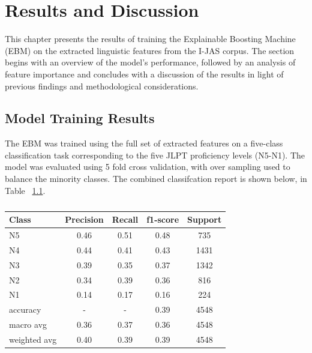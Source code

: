 \chapter{Results and Discussion}
This chapter presents the results of training the Explainable Boosting Machine (EBM) on the extracted linguistic
features from the I-JAS corpus. The section begins with an overview of the model's performance, followed by an
analysis of feature importance and concludes with a discussion of the results in light of previous findings and
methodological considerations.


\section{Model Training Results}

The EBM was trained using the full set of extracted features on a five-class classification task corresponding to
the five JLPT proficiency levels (N5-N1). The model was evaluated using 5 fold cross validation, with over sampling
used to balance the minority classes. The combined classifcation report is shown below, in Table~
\ref{tab:trainingResults}.


\begin{table}[h!]
    \centering
    \begin{tabular}{lcccc}
        \hline \textbf{Class} & \textbf{Precision} & \textbf{Recall} & \textbf{f1-score} & \textbf{Support} \\ \hline
        N5    &   0.46   &   0.51   &   0.48   &    735\\
          N4    &   0.44   &   0.41   &   0.43   &   1431\\
          N3    &   0.39   &   0.35   &   0.37  &    1342\\
          N2  &     0.34   &   0.39  &    0.36   &    816\\
          N1    &   0.14   &   0.17   &   0.16    &   224\\ \hline
        accuracy &   -    &      -    &     0.39  &    4548\\
   macro avg  &     0.36   &   0.37  &    0.36   &   4548\\
weighted avg  &     0.40  &    0.39    &  0.39   &   4548\\ \hline
    \end{tabular}
    \caption[Overall Classification Report (All Folds Combined)]{}
    \label{tab:trainingResults}
\end{table}

